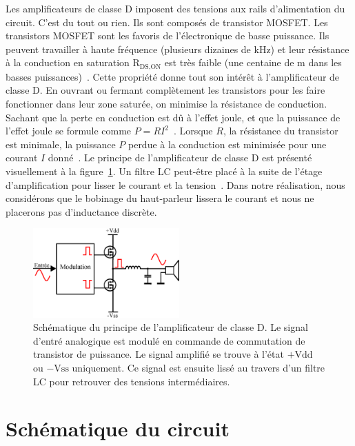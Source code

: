 \documentclass[10pt, oneside, a4paper]{article}
\begin{document}
Les amplificateurs de classe D imposent des tensions aux rails d'alimentation du circuit.
C'est du tout ou rien.
Ils sont composés de transistor MOSFET.
Les transistors MOSFET sont les favoris de l'électronique de basse puissance.
Ils peuvent travailler à haute fréquence (plusieurs dizaines de kHz) et leur résistance à la conduction en saturation \og $\text{R}_{\text{DS,ON}}$ \fg{} est très faible (une centaine de m\Omega{} dans les basses puissances)~\cite{irf2017mosfet}.
Cette propriété donne tout son intérêt à l'amplificateur de classe D.
En ouvrant ou fermant complètement les transistors pour les faire fonctionner dans leur zone saturée, on minimise la résistance de conduction.
Sachant que la perte en conduction est dû à l'effet joule, et que la puissance de l'effet joule se formule comme $P=RI^2$~\cite{griffiths1999introduction}.
Lorsque $R$, la résistance du transistor est minimale, la puissance $P$ perdue à la conduction est minimisée pour une courant $I$ donné~\cite{sente2017elec}.
Le principe de l'amplificateur de classe D est présenté visuellement à la figure~\ref{fig:classeD}.
Un filtre LC peut-être placé à la suite de l'étage d'amplification pour lisser le courant et la tension~\cite{wildi2005electrotech}.
Dans notre réalisation, nous considérons que le bobinage du haut-parleur lissera le courant et nous ne placerons pas d'inductance discrète.

\begin{figure}[tbp]
    \centering
    \includegraphics[width=0.5\textwidth]{eps/classe-d.eps}
    \caption{Schématique du principe de l'amplificateur de classe D.
    Le signal d'entré analogique est modulé en commande de commutation de transistor de puissance.
    Le signal amplifié se trouve à l'état $+\text{Vdd}$ ou $-\text{Vss}$ uniquement.
    Ce signal est ensuite lissé au travers d'un filtre LC pour retrouver des tensions intermédiaires.}
    \label{fig:classeD}
\end{figure}


\section{Schématique du circuit}
\end{document}
